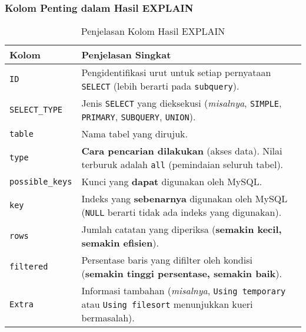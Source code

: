 \documentclass{article}
\begin{document}
\subsubsection{Kolom Penting dalam Hasil EXPLAIN}
\begin{table}[!ht]
    \caption{Penjelasan Kolom Hasil EXPLAIN}
    \centering
    \begin{tabular}{|l|l|}
        \hline
        \textbf{Kolom}          & \textbf{Penjelasan Singkat}                                                                                                      \\
        \hline
        \texttt{ID}             & Pengidentifikasi urut untuk setiap pernyataan \texttt{SELECT} (lebih berarti pada \texttt{subquery}).                            \\
        \hline
        \texttt{SELECT\_TYPE}   & Jenis \texttt{SELECT} yang dieksekusi (\textit{misalnya}, \texttt{SIMPLE}, \texttt{PRIMARY}, \texttt{SUBQUERY}, \texttt{UNION}). \\
        \hline
        \texttt{table}          & Nama tabel yang dirujuk.                                                                                                         \\
        \hline
        \texttt{type}           & \textbf{Cara pencarian dilakukan} (akses data). Nilai terburuk adalah \texttt{all} (pemindaian seluruh tabel).                   \\
        \hline
        \texttt{possible\_keys} & Kunci yang \textbf{dapat} digunakan oleh MySQL.                                                                                  \\
        \hline
        \texttt{key}            & Indeks yang \textbf{sebenarnya} digunakan oleh MySQL (\texttt{NULL} berarti tidak ada indeks yang digunakan).                    \\
        \hline
        \texttt{rows}           & Jumlah catatan yang diperiksa (\textbf{semakin kecil, semakin efisien}).                                                         \\
        \hline
        \texttt{filtered}       & Persentase baris yang difilter oleh kondisi (\textbf{semakin tinggi persentase, semakin baik}).                                  \\
        \hline
        \texttt{Extra}          & Informasi tambahan (\textit{misalnya}, \texttt{Using temporary} atau \texttt{Using filesort} menunjukkan kueri bermasalah).      \\
        \hline
    \end{tabular}
\end{table}
\end{document}
